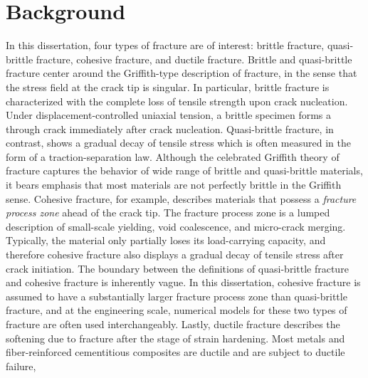 \section{Background}

In this dissertation, four types of fracture are of interest: brittle fracture, quasi-brittle fracture, cohesive fracture, and ductile fracture. Brittle and quasi-brittle fracture center around the Griffith-type description of fracture, in the sense that the stress field at the crack tip is singular. In particular, brittle fracture is characterized with the complete loss of tensile strength upon crack nucleation. Under displacement-controlled uniaxial tension, a brittle specimen forms a through crack immediately after crack nucleation. Quasi-brittle fracture, in contrast, shows a gradual decay of tensile stress which is often measured in the form of a traction-separation law. Although the celebrated Griffith theory of fracture captures the behavior of wide range of brittle and quasi-brittle materials, it bears emphasis that most materials are not perfectly brittle in the Griffith sense. Cohesive fracture, for example, describes materials that possess a \emph{fracture process zone} ahead of the crack tip. The fracture process zone is a lumped description of small-scale yielding, void coalescence, and micro-crack merging. Typically, the material only partially loses its load-carrying capacity, and therefore cohesive fracture also displays a gradual decay of tensile stress after crack initiation. The boundary between the definitions of quasi-brittle fracture and cohesive fracture is inherently vague. In this dissertation, cohesive fracture is assumed to have a substantially larger fracture process zone than quasi-brittle fracture, and at the engineering scale, numerical models for these two types of fracture are often used interchangeably. Lastly, ductile fracture describes the softening due to fracture after the stage of strain hardening. Most metals and fiber-reinforced cementitious composites are ductile and are subject to ductile failure,

